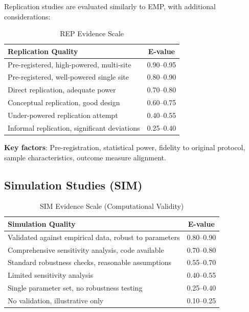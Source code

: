 \documentclass[11pt,a4paper]{article}
\begin{document}
Replication studies are evaluated similarly to EMP, with additional considerations:

\begin{table}[h]
\centering
\caption{REP Evidence Scale}
\label{tab:rep-scale}
\begin{tabular}{lc}
\toprule
\textbf{Replication Quality} & \textbf{E-value} \\
\midrule
Pre-registered, high-powered, multi-site & 0.90--0.95 \\
Pre-registered, well-powered single site & 0.80--0.90 \\
Direct replication, adequate power & 0.70--0.80 \\
Conceptual replication, good design & 0.60--0.75 \\
Under-powered replication attempt & 0.40--0.55 \\
Informal replication, significant deviations & 0.25--0.40 \\
\bottomrule
\end{tabular}
\end{table}

\textbf{Key factors}: Pre-registration, statistical power, fidelity to original protocol, sample characteristics, outcome measure alignment.

\subsection{Simulation Studies (SIM)}

\begin{table}[h]
\centering
\caption{SIM Evidence Scale (Computational Validity)}
\label{tab:sim-scale}
\begin{tabular}{lc}
\toprule
\textbf{Simulation Quality} & \textbf{E-value} \\
\midrule
Validated against empirical data, robust to parameters & 0.80--0.90 \\
Comprehensive sensitivity analysis, code available & 0.70--0.80 \\
Standard robustness checks, reasonable assumptions & 0.55--0.70 \\
Limited sensitivity analysis & 0.40--0.55 \\
Single parameter set, no robustness testing & 0.25--0.40 \\
No validation, illustrative only & 0.10--0.25 \\
\bottomrule
\end{tabular}
\end{table}
\end{document}
